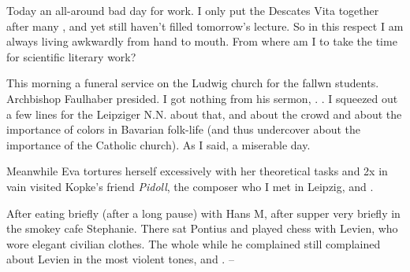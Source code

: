 
Today an all-around bad day for work. I only put the Descates Vita together after many , and yet still haven't filled tomorrow's lecture. So in this respect I am always living awkwardly from hand to mouth. From where am I to take the time for scientific literary work?

This morning a funeral service on the Ludwig church for the fallwn students. Archbishop Faulhaber presided. I got nothing from his sermon, . . I squeezed out a few lines for the Leipziger N.N. about that, and about the crowd and about the importance of colors in Bavarian folk-life (and thus undercover about the importance of the Catholic church). As I said, a miserable day.

Meanwhile Eva tortures herself excessively with her theoretical tasks and 2x in vain visited Kopke's friend \textit{Pidoll}, the composer who I met in Leipzig, and .

After eating briefly (after a long pause) with Hans M, after supper very briefly in the smokey  cafe Stephanie. There sat Pontius and played chess with Levien, who wore elegant civilian clothes. The whole while he complained still complained about Levien in the most violent tones, and . --

